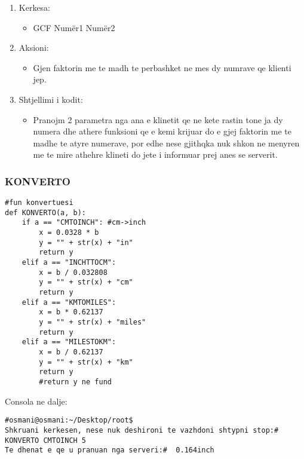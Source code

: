 \documentclass[]{article}
\begin{document}
\begin{enumerate}
\item Kerkesa:
\begin{itemize}
\item GCF  Numër1  Numër2
\end{itemize}
\item Aksioni:
\begin{itemize}
\item Gjen faktorin me te madh te perbashket ne mes dy numrave qe klienti jep.
\end{itemize}
\item Shtjellimi i kodit:
\begin{itemize}
\item Pranojm 2 parametra nga ana e klinetit qe ne kete rastin tone ja dy numera dhe athere funksioni qe e kemi krijuar do e gjej faktorin me te madhe te atyre numerave, por edhe nese gjithqka nuk shkon ne menyren me te mire athehre klineti do jete i informuar prej anes se serverit.
\end{itemize}
\end{enumerate}
\newpage
\subsubsection{KONVERTO}

\begin{lstlisting}
#fun konvertuesi
def KONVERTO(a, b):
    if a == "CMTOINCH": #cm->inch
        x = 0.0328 * b
        y = "" + str(x) + "in"
        return y
    elif a == "INCHTTOCM":
        x = b / 0.032808
        y = "" + str(x) + "cm"
        return y
    elif a == "KMTOMILES":
        x = b * 0.62137
        y = "" + str(x) + "miles"
        return y
    elif a == "MILESTOKM":
        x = b / 0.62137
        y = "" + str(x) + "km"
        return y
        #return y ne fund
\end{lstlisting}
\vspace{1cm}
\noindent Consola ne dalje:
\begin{lstlisting}
#osmani@osmani:~/Desktop/root$
Shkruani kerkesen, nese nuk deshironi te vazhdoni shtypni stop:# KONVERTO CMTOINCH 5
Te dhenat e qe u pranuan nga serveri:#  0.164inch

\end{lstlisting}
\end{document}
